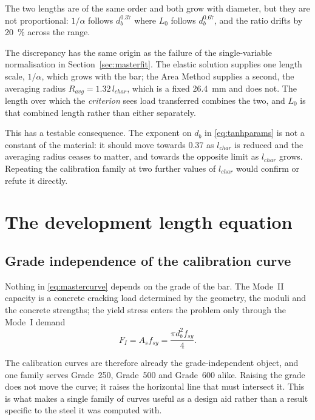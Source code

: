 The two lengths are of the same order and both grow with diameter, but they
are not proportional: $1/\alpha$ follows $d_b^{0.37}$ where $L_0$ follows
$d_b^{0.67}$, and the ratio drifts by \SI{20}{\percent} across the range.

The discrepancy has the same origin as the failure of the single-variable
normalisation in Section~\ref{sec:masterfit}. The elastic solution supplies
one length scale, $1/\alpha$, which grows with the bar; the Area Method
supplies a second, the averaging radius $R_{avg} = 1.32\,l_{char}$, which is
a fixed \SI{26.4}{\milli\metre} and does not. The length over which the
\emph{criterion} sees load transferred combines the two, and $L_0$ is that
combined length rather than either separately.

This has a testable consequence. The exponent on $d_b$ in
\eqref{eq:tanhparams} is not a constant of the material: it should move
towards \num{0.37} as $l_{char}$ is reduced and the averaging radius ceases
to matter, and towards the opposite limit as $l_{char}$ grows. Repeating the
calibration family at two further values of $l_{char}$ would confirm or
refute it directly.


\section{The development length equation}
\label{sec:devequation}

\subsection{Grade independence of the calibration curve}

Nothing in \eqref{eq:mastercurve} depends on the grade of the bar. The
Mode~II capacity is a concrete cracking load determined by the geometry, the
moduli and the concrete strengths; the yield stress enters the problem only
through the Mode~I demand
\begin{equation}
\label{eq:demand}
F_I = A_s f_{sy} = \frac{\pi d_b^2 f_{sy}}{4}.
\end{equation}

The calibration curves are therefore already the grade-independent object,
and one family serves Grade~250, Grade~500 and Grade~600 alike. Raising the
grade does not move the curve; it raises the horizontal line that must
intersect it. This is what makes a single family of curves useful as a
design aid rather than a result specific to the steel it was computed with.

